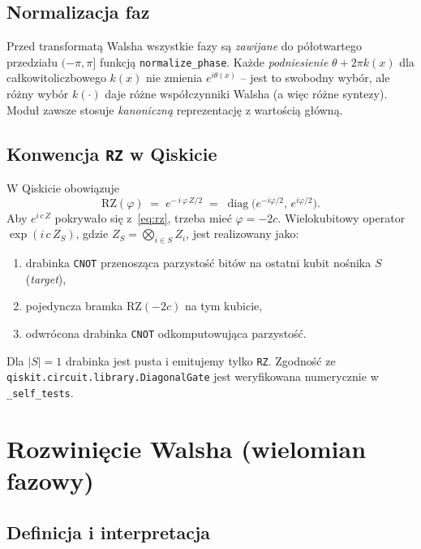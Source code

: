 \documentclass[11pt,a4paper]{article}
\newcommand{\1}{\mathbf{1}}
\newcommand{\diag}{\operatorname{diag}}
\newcommand{\code}[1]{\texttt{#1}}
\begin{document}
\subsection{Normalizacja faz}
\label{sec:normalize}

Przed transformatą Walsha wszystkie fazy są \emph{zawijane} do
półotwartego przedziału $(-\pi,\pi]$ funkcją \code{normalize\_phase}.
Każde \emph{podniesienie} $\theta+2\pi k(x)$ dla całkowitoliczbowego
$k(x)$ nie zmienia $e^{i\theta(x)}$ -- jest to swobodny wybór, ale
różny wybór $k(\cdot)$ daje różne współczynniki Walsha (a więc różne
syntezy). Moduł zawsze stosuje \emph{kanoniczną} reprezentację z
wartością główną.

\subsection{Konwencja \texttt{RZ} w Qiskicie}
\label{sec:rz-convention}

W Qiskicie obowiązuje
\begin{equation}
\label{eq:rz}
\mathrm{RZ}(\varphi) \;=\; e^{-\,i\,\varphi\,Z/2}
\;=\; \diag\!\bigl(e^{-i\varphi/2},\,e^{i\varphi/2}\bigr).
\end{equation}
Aby $e^{i\,c\,Z}$ pokrywało się z~\eqref{eq:rz}, trzeba mieć
$\varphi=-2c$. Wielokubitowy operator
$\exp(i\,c\,Z_{S})$, gdzie $Z_{S}=\bigotimes_{i\in S}Z_{i}$, jest
realizowany jako:
\begin{enumerate}[leftmargin=*]
  \item drabinka \code{CNOT} przenosząca parzystość bitów na ostatni
        kubit nośnika $S$ (\emph{target}),
  \item pojedyncza bramka $\mathrm{RZ}(-2c)$ na tym kubicie,
  \item odwrócona drabinka \code{CNOT} odkomputowująca parzystość.
\end{enumerate}
Dla $|S|=1$ drabinka jest pusta i emitujemy tylko \code{RZ}. Zgodność
ze \code{qiskit.circuit.library.DiagonalGate} jest weryfikowana
numerycznie w \code{\_self\_tests}.

\section{Rozwinięcie Walsha (wielomian fazowy)}
\label{sec:walsh}

\subsection{Definicja i interpretacja}
\end{document}

